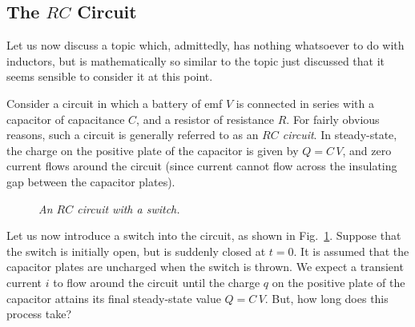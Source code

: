 \subsection{The $RC$ Circuit}\label{s10.6}
Let us now discuss a topic which, admittedly, has nothing whatsoever to
do with inductors, but is mathematically so similar to the topic just discussed
that it seems sensible to consider it at
this point. 

Consider a circuit in which a battery of emf $V$ is connected in series with
a capacitor of capacitance $C$, and a resistor of resistance $R$.
For fairly obvious reasons, such a circuit is generally referred to as
an {\em $RC$ circuit}. In steady-state, the charge on the positive plate
of the capacitor is given by $Q=C\,V$, and zero current flows around the circuit
(since current cannot flow across the insulating gap between the capacitor
plates). 

\begin{figure}
\epsfysize=2in
\centerline{}
\caption{\em An $RC$ circuit with a switch.}\label{f10.6}
\end{figure}

Let us now introduce a switch into the circuit, as shown in Fig.~\ref{f10.6}. Suppose
that the switch is initially open, but is suddenly closed at $t=0$. It is
assumed that the capacitor plates are uncharged when the switch is thrown. 
We expect a transient current $i$ to flow around the circuit until
the charge $q$ on the positive plate of the capacitor attains its
final steady-state value $Q=C\,V$. But, how long does this process take?

